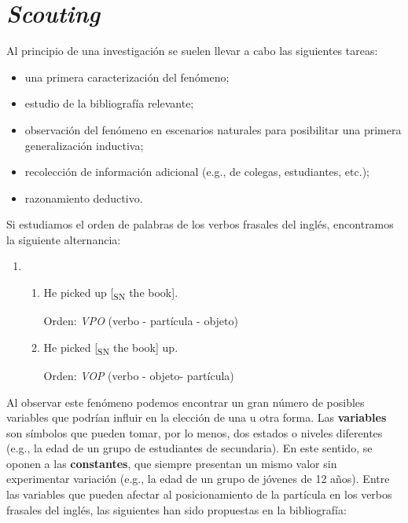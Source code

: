\documentclass[authoryear,a4paper, 14pt]{scrartcl}
\begin{document}
\hypertarget{scouting}{%
\section{\texorpdfstring{\emph{Scouting}}{Scouting}}\label{scouting}}

Al principio de una investigación se suelen llevar a cabo las siguientes
tareas:

\begin{itemize}
    \item
      una primera caracterización del fenómeno;
    \item
      estudio de la bibliografía relevante;
    \item
      observación del fenómeno en escenarios naturales para posibilitar una
      primera generalización inductiva;
    \item
      recolección de información adicional (e.g., de colegas, estudiantes,
      etc.);
    \item
      razonamiento deductivo.
\end{itemize}

Si estudiamos el orden de palabras de los verbos frasales del inglés,
encontramos la siguiente alternancia:

\begin{enumerate}
\def\labelenumi{(\arabic{enumi})}
\item
  \begin{enumerate}
  \def\labelenumii{\alph{enumii}.}
  \item
    He picked up {[}\textsubscript{SN} the book{]}.

    Orden: \emph{VPO} (verbo - partícula - objeto)
  \item
    He picked {[}\textsubscript{SN} the book{]} up.

    Orden: \emph{VOP} (verbo - objeto- partícula)
  \end{enumerate}
\end{enumerate}

Al observar este fenómeno podemos encontrar un gran número de posibles
variables que podrían influir en la elección de una u otra forma. Las
\textbf{variables} son símbolos que pueden tomar, por lo menos, dos
estados o niveles diferentes (e.g., la edad de un grupo de estudiantes
de secundaria). En este sentido, se oponen a las \textbf{constantes},
que siempre presentan un mismo valor sin experimentar variación (e.g.,
la edad de un grupo de jóvenes de 12 años). Entre las variables que
pueden afectar al posicionamiento de la partícula en los verbos frasales
del inglés, las siguientes han sido propuestas en la bibliografía:
\end{document}
